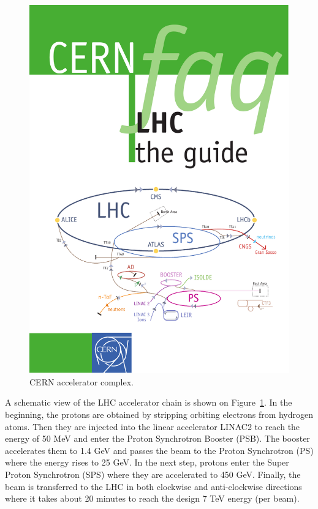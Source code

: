 \begin{figure}[!htbp]
  \begin{center}
    \leavevmode
    \includegraphics[width=\columnwidth]{LHC}
    \caption{CERN accelerator complex.}
    \label{LHC}
  \end{center}
\end{figure}

A schematic view of the LHC accelerator chain is shown on Figure~\ref{LHC}. In the beginning, the protons are obtained by
stripping orbiting electrons from hydrogen atoms. Then they are injected into the linear accelerator LINAC2 to reach the
energy of 50 MeV and enter the Proton Synchrotron Booster (PSB). The booster accelerates them to 1.4 GeV and passes the
beam to the Proton Synchrotron (PS) where the energy rises to 25 GeV. In the next step, protons enter the Super Proton
Synchrotron (SPS) where they are accelerated to 450 GeV. Finally, the beam is transferred to the LHC in both clockwise
and anti-clockwise directions where it takes about 20 minutes to reach the design 7 TeV energy (per beam).

